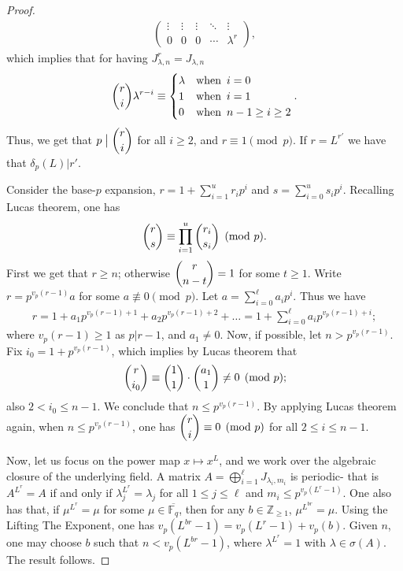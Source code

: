 \documentclass[11pt,twoside]{amsart}
\newcommand{\Z}{\mathbb{Z}}
\newcommand{\F}{\mathbb{F}}
\theoremstyle{definition} %
\begin{document}
\begin{proof}
\begin{align*}
\begin{pmatrix}
\vdots & \vdots & \vdots & \ddots & \vdots \\
0 & 0 & 0 & \cdots & \lambda^r
\end{pmatrix},
\end{align*}
which implies that for having $J_{\lambda,n}^r=J_{\lambda,n}$ 
\begin{align*}
    \displaystyle{\dbinom{r}{i}}\lambda^{r-i}\equiv\begin{cases}
       \lambda&\text{when }\,i=0\\
       1&\text{when }\,i=1\\
       0&\text{when }\, n-1\geq i\geq 2
    \end{cases}.
\end{align*}
Thus, we get that $p\bigm|\dbinom{r}{i}$ for all $i\geq 2$, and $r\equiv 1\pmod{p}$.
If $r=L^{r'}$ we have that $\delta_p(L)|r'$.

Consider the base-$p$ expansion, $r=1+\sum\limits_{i=1}^{u}r_ip^i$ and $s=\sum\limits_{i=0}^{u}s_ip^i$.
Recalling Lucas theorem, one has
\begin{align*}
    \dbinom{r}{s}\equiv\prod\limits_{i=1}^u\dbinom{r_i}{s_i}\pmod{p}.
\end{align*}
First we get that $r\geq n$; otherwise $\dbinom{r}{n-t}=1$ for some $t\geq 1$.
Write $r=p^{v_p(r-1)}a$ for some $a\not\equiv 0 \pmod{p}$.
Let $a=\sum\limits_{i=0}^\ell a_ip^i$.
Thus we have 
\begin{align*}
    r=1+a_1p^{v_p(r-1)+1}+a_2p^{v_p(r-1)+2}+\ldots=1+\sum\limits_{i=0}^{\ell}a_ip^{v_p(r-1)+i};
\end{align*}
where $v_p(r-1)\geq 1$ as $p|r-1$, and $a_1\neq 0$. Now, if possible, let $n>p^{v_p(r-1)}$. Fix $i_0=1+p^{v_p(r-1)}$, which implies by Lucas theorem that
\begin{align*}
    \dbinom{r}{i_0}\equiv\dbinom{1}{1}\cdot\dbinom{a_1}{1}\neq 0\pmod{p};
\end{align*}
also $2<i_0\leq n-1$. 
We conclude that $n\leq p^{v_p(r-1)}$.
By applying Lucas theorem again, when $n\leq p^{v_p(r-1)}$, one has $\dbinom{r}{i}\equiv0\pmod{p}$ for all $2\leq i\leq n-1$.

Now, let us focus on the power map $x\mapsto x^L$, and we work over the algebraic closure of the underlying field.
A matrix $A=\bigoplus\limits_{i=1}^{\ell}J_{\lambda_i,m_i}$ is periodic- that is $A^{L^r}=A$ if and only if $\lambda_j^{L^r}=\lambda_j$ for all $1\leq j\leq \ell$ and $m_i\leq p^{v_p(L^r-1)}$.
One also has that, if $\mu^{L^r}=\mu$ for some $\mu\in\overline{\F_q}$, then for any $b\in\Z_{\geq 1}$, $\mu^{L^{br}}=\mu$. 
Using the Lifting The Exponent, one has $v_p(L^{br}-1)=v_p(L^r-1)+v_p(b)$. 
Given $n$, one may choose $b$ such that $n<v_p(L^{br}-1)$, where $\lambda^{L^r}=1$ with $\lambda\in\sigma(A)$. The result follows.
\end{proof}
\end{document}
